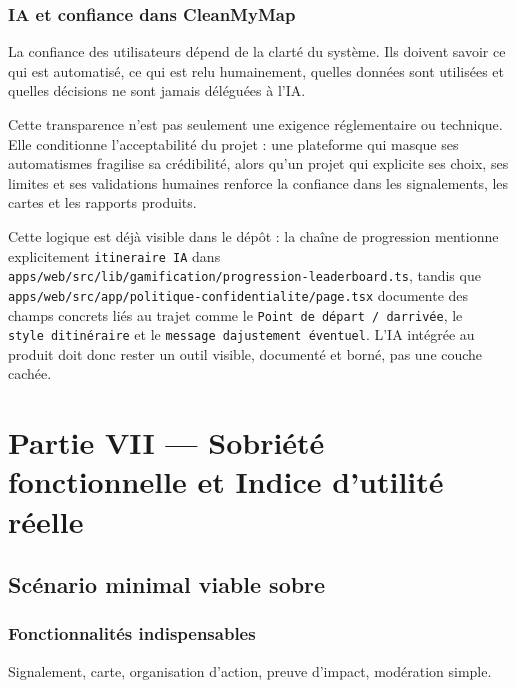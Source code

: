 \documentclass[
  10pt,
  a4paper,
  DIV=11,
  numbers=noendperiod,
  oneside]{scrreprt}
\begin{document}
\subsection{IA et confiance dans
CleanMyMap}\label{ia-et-confiance-dans-cleanmymap}

La confiance des utilisateurs dépend de la clarté du système. Ils
doivent savoir ce qui est automatisé, ce qui est relu humainement,
quelles données sont utilisées et quelles décisions ne sont jamais
déléguées à l'IA.

Cette transparence n'est pas seulement une exigence réglementaire ou
technique. Elle conditionne l'acceptabilité du projet : une plateforme
qui masque ses automatismes fragilise sa crédibilité, alors qu'un projet
qui explicite ses choix, ses limites et ses validations humaines
renforce la confiance dans les signalements, les cartes et les rapports
produits.

Cette logique est déjà visible dans le dépôt : la chaîne de progression
mentionne explicitement \texttt{itineraire\ IA} dans
\texttt{apps/web/src/lib/gamification/progression-leaderboard.ts},
tandis que \texttt{apps/web/src/app/politique-confidentialite/page.tsx}
documente des champs concrets liés au trajet comme le
\texttt{Point\ de\ départ\ /\ d\textquotesingle{}arrivée}, le
\texttt{style\ d\textquotesingle{}itinéraire} et le
\texttt{message\ d\textquotesingle{}ajustement\ éventuel}. L'IA intégrée
au produit doit donc rester un outil visible, documenté et borné, pas
une couche cachée.

\chapter{Partie VII --- Sobriété fonctionnelle et Indice d'utilité
réelle}\label{partie-vii-sobriete-fonctionnelle-et-indice-dutilite-reelle}

\section{Scénario minimal viable
sobre}\label{scuxe9nario-minimal-viable-sobre}

\subsection{Fonctionnalités
indispensables}\label{fonctionnalituxe9s-indispensables}

Signalement, carte, organisation d'action, preuve d'impact, modération
simple.
\end{document}
